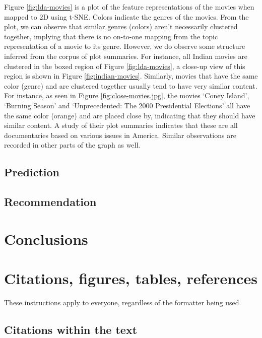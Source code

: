 \documentclass{article} %
\begin{document}

Figure \ref{fig:lda-movies} is a plot of the feature representations of the
movies when mapped to 2D using t-SNE. Colors indicate the genres of the movies.
From the plot, we can observe that similar genres (colors) aren't necessarily
clustered together, implying that there is no on-to-one mapping from the topic
representation of a movie to its genre. However, we do observe some structure 
inferred from the corpus of plot summaries. For instance, all Indian movies
are clustered in the boxed region of Figure \ref{fig:lda-movies}, a close-up
view of this region is shown in Figure \ref{fig:indian-movies}. Similarly, 
movies that have the same color (genre) and are clustered together usually
tend to have very similar content. For instance, as seen in Figure \ref{fig:close-movies.jpg}, the movies `Coney Island', `Burning Season' and `Unprecedented: The 2000 Presidential Elections' all have the same color (orange) and are placed
close by, indicating that they should have similar content. A study of their 
plot summaries indicates that these are all documentaries based on various 
issues in America. Similar observations are recorded in other parts of the graph
as well. 

\subsection{Prediction}




\subsection{Recommendation}









\section{Conclusions}


\section{Citations, figures, tables, references}
\label{others}

These instructions apply to everyone, regardless of the formatter being used.

\subsection{Citations within the text}
\end{document}
